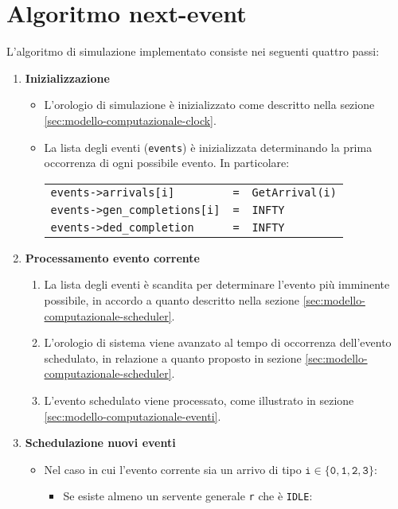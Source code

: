 \section{Algoritmo next-event}\label{sec:modello-computazionale-algoritmo}
L'algoritmo di simulazione implementato consiste nei seguenti quattro passi:
\begin{enumerate}[label=Step \arabic*), align=left, leftmargin=*]
\item \textbf{Inizializzazione}
\begin{itemize}
\item L'orologio di simulazione è inizializzato come descritto nella sezione \ref{sec:modello-computazionale-clock}.
\item La lista degli eventi (\texttt{events}) è inizializzata determinando la prima occorrenza di ogni possibile evento. In particolare:
\begin{center}
\begin{tabular}{l l l}
\texttt{events->arrivals[i]} & \texttt{=} & \texttt{GetArrival(i)} \\
\texttt{events->gen\_completions[i]} & \texttt{=} & \texttt{INFTY} \\
\texttt{events->ded\_completion} & \texttt{=} & \texttt{INFTY}
\end{tabular}
\end{center}
\end{itemize}
\item \textbf{Processamento evento corrente}
\begin{enumerate}
\item La lista degli eventi è scandita per determinare l'evento più imminente possibile, in accordo a quanto descritto nella sezione \ref{sec:modello-computazionale-scheduler}.
\item L'orologio di sistema viene avanzato al tempo di occorrenza dell'evento schedulato, in relazione a quanto proposto in sezione \ref{sec:modello-computazionale-scheduler}.
\item L'evento schedulato viene processato, come illustrato in sezione \ref{sec:modello-computazionale-eventi}.
\end{enumerate}
\item \textbf{Schedulazione nuovi eventi}
\begin{itemize}
\item Nel caso in cui l'evento corrente sia un arrivo di tipo $\mathtt{i \in \lbrace 0, 1, 2, 3 \rbrace}$:
\begin{itemize}
\item Se esiste almeno un servente generale \texttt{r} che è \texttt{IDLE}:

\end{itemize}
\end{itemize}
\end{enumerate}

